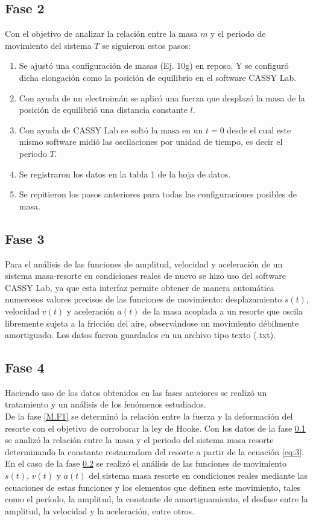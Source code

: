 \documentclass[spanish,notitlepage,letterpaper, 12pt]{article}
\begin{document}
\subsection{Fase 2} \label{M.F2}
Con el objetivo de analizar la relación entre la masa $m$ y el periodo de movimiento del sistema $T$ se siguieron estos pasos:
\begin{enumerate}
    \item Se ajustó una configuración de masas (Ej. 10g) en reposo. Y se configuró dicha elongación como la posición de equilibrio en el software CASSY Lab.
    \item Con ayuda de un electroimán se aplicó una fuerza que desplazó la masa de la posición de equilibrió una distancia constante $l$.
    \item Con ayuda de CASSY Lab se soltó la masa en un $t=0$ desde el cual este mismo software midió las oscilaciones por unidad de tiempo, es decir el periodo $T$.
    \item Se registraron los datos en la tabla 1 de la hoja de datos.
    \item Se repitieron los pasos anteriores para todas las configuraciones posibles de masa.
\end{enumerate}
\subsection{Fase 3} \label{M.F3}
Para el análisis de las funciones de amplitud, velocidad y aceleración de un sistema masa-resorte en condiciones reales de nuevo se hizo uso del software CASSY Lab, ya que esta interfaz permite obtener de manera automática numerosos valores precisos de las funciones de movimiento: desplazamiento $s(t)$, velocidad $v(t)$ y aceleración $a(t)$ de la masa acoplada a un resorte que oscila libremente sujeta a la fricción del aire, observándose un movimiento débilmente amortiguado. Los datos fueron guardados en un archivo tipo texto (.txt). 
\subsection{Fase 4}
Haciendo uso de los datos obtenidos en las fases anteiores se realizó un tratamiento y un análisis de los fenómenos estudiados.\\

De la fase \ref{M.F1} se determinó la relación entre la fuerza y la deformación del resorte con el objetivo de corroborar la ley de Hooke. Con los datos de la fase \ref{M.F2} se analizó la relación entre la masa y el periodo del sistema masa resorte determinando la constante restauradora del resorte a partir de la ecuación \eqref{eq:3}. En el caso de la fase \ref{M.F3} se realizó el análisis de las funciones de movimiento $s(t)$, $v(t)$ y $a(t)$ del sistema masa resorte en condiciones reales mediante las ecuaciones de estas funciones y los elementos que definen este movimiento, tales como el período, la amplitud, la constante de amortiguamiento, el desfase entre la amplitud, la velocidad y la aceleración, entre otros.\\
\end{document}
